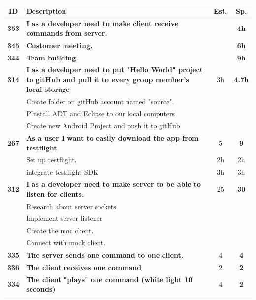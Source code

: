 \begin{longtable}{cp{8cm}cc} 
\toprule[1mm]
\textbf{ID} 	& \textbf{Description} 									& \textbf{Est.} & \textbf{Sp.} \\
\hline
\textbf{353} 	& {\bf I as a developer need to make client receive commands from server.} 	& 			& \textbf{4h} \\

\textbf{345} 	& {\bf Customer meeting.} 	& 			& \textbf{6h} \\

\textbf{344} 	& {\bf Team building.} 	& 			& \textbf{9h} \\
				
\textbf{314} 	& {\bf I as a developer need to put "Hello World" project to gitHub and pull it to every group member's local storage} 	& 	3h	& \textbf{ 4.7h} \\
				& Create folder on gitHub account named "source".	&  &  \\
				& PInstall ADT and Eclipse to our local computers 	&  &  \\
				& Create new Android Project and push it to gitHub 	&  &  \\
				
\textbf{267} 	& {\bf As a user I want to easily download the app from testflight. } 	& 		5	& \textbf{9} \\
				& Set up testflight.	& 2h & 2h \\
				& integrate testflight SDK & 3h & 3h \\
				
\textbf{312} 	& {\bf I as a developer need to make server to be able to listen for clients.} 	& 	25	& \textbf{30} \\
				& Research about server sockets	&  &  \\
				& Implement server listener	&  &  \\
				& Create the moc client. &  &  \\
				& Connect with mock client. &  &  \\
				
\textbf{335} 	& {\bf The server sends one command to one client. } 	& 		4	& \textbf{4} \\

\textbf{336} 	& {\bf The client receives one command } 	& 	2	& \textbf{2} \\

\textbf{334} 	& {\bf The client "plays" one command (white light 10 seconds) } 	& 		4	& \textbf{2} \\


\end{longtable}
